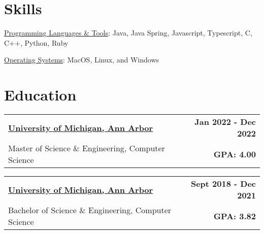 \documentclass[11pt]{extreport}
\makeatletter
\newcommand{\resumeSubheading}[4]{
  \vspace{-1pt}
    \begin{tabular*}{1.0\textwidth}{l@{\extracolsep{\fill}}r}
      \textbf{#1} & \textbf{#2}  \vspace{1mm} \\
      {#3} & \textbf{#4} \\
    \end{tabular*}\vspace{-3pt}
}
\makeatother
\begin{document}
    \section{Skills}
        \underline{Programming Languages \& Tools}: Java, Java Spring, Javascript, Typescript, C, C++, Python, Ruby

        
        \underline{Operating Systems}: MacOS, Linux, and Windows
      \vspace{2mm}


\vspace{-1.5mm}

\section{Education}
        \resumeSubheading{\underline{University of Michigan, Ann Arbor}} {Jan 2022 - Dec 2022}
      {Master of Science \& Engineering, Computer Science}{GPA: 4.00}
     
      \vspace{2mm}
    \resumeSubheading{\underline{University of Michigan, Ann Arbor}}{Sept 2018 - Dec 2021}
      {Bachelor of Science \& Engineering, Computer Science}{GPA: 3.82}
    \vspace{-1mm}

\vspace{-1.5mm}
\vspace{-5pt}
\end{document}

